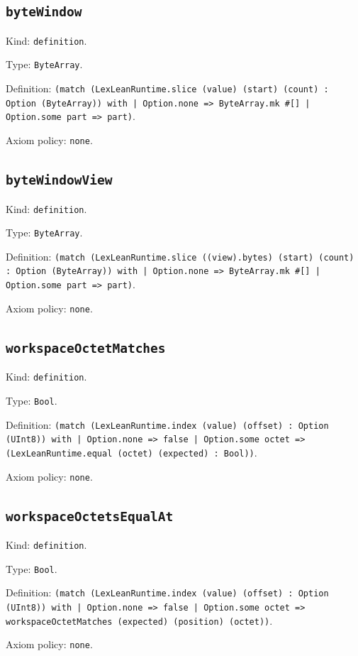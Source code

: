\documentclass[11pt]{article}
\begin{document}
\subsection*{\texttt{byteWindow}}
\noindent Kind: \texttt{definition}.\par
\noindent Type: \texttt{ByteArray}.\par
\noindent Definition: \texttt{(match (LexLeanRuntime.slice (value) (start) (count) : Option (ByteArray)) with | Option.none => ByteArray.mk \#[] | Option.some part => part)}.\par
\noindent Axiom policy: \texttt{none}.\par
\subsection*{\texttt{byteWindowView}}
\noindent Kind: \texttt{definition}.\par
\noindent Type: \texttt{ByteArray}.\par
\noindent Definition: \texttt{(match (LexLeanRuntime.slice ((view).bytes) (start) (count) : Option (ByteArray)) with | Option.none => ByteArray.mk \#[] | Option.some part => part)}.\par
\noindent Axiom policy: \texttt{none}.\par
\subsection*{\texttt{workspaceOctetMatches}}
\noindent Kind: \texttt{definition}.\par
\noindent Type: \texttt{Bool}.\par
\noindent Definition: \texttt{(match (LexLeanRuntime.index (value) (offset) : Option (UInt8)) with | Option.none => false | Option.some octet => (LexLeanRuntime.equal (octet) (expected) : Bool))}.\par
\noindent Axiom policy: \texttt{none}.\par
\subsection*{\texttt{workspaceOctetsEqualAt}}
\noindent Kind: \texttt{definition}.\par
\noindent Type: \texttt{Bool}.\par
\noindent Definition: \texttt{(match (LexLeanRuntime.index (value) (offset) : Option (UInt8)) with | Option.none => false | Option.some octet => workspaceOctetMatches (expected) (position) (octet))}.\par
\noindent Axiom policy: \texttt{none}.\par
\end{document}
